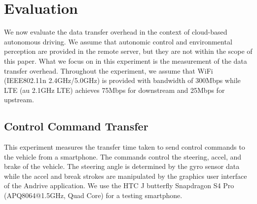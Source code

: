 \section{Evaluation}
\label{sec:evaluation}

We now evaluate the data transfer overhead in the context of cloud-based
autonomous driving.
We assume that autonomic control and environmental perception are
provided in the remote server, but they are not within the scope of this
paper.
What we focus on in this experiment is the measurement of the data
transfer overhead.
Throughout the experiment, we assume that WiFi (IEEE802.11n
2.4GHz/5.0GHz) is provided with bandwidth of 300Mbps while LTE (au
2.1GHz LTE) achieves 75Mbps for downstream and 25Mbps for upstream.


\subsection{Control Command Transfer}

This experiment measures the transfer time taken to send control
commands to the vehicle from a smartphone.
The commands control the steering, accel, and brake of the vehicle.
The steering angle is determined by the gyro sensor data while the accel
and break strokes are manipulated by the graphics user interface of the
Andrive application.
We use the HTC J butterfly Snapdragon S4 Pro (APQ8064@1.5GHz, Quad Core)
for a testing smartphone.

